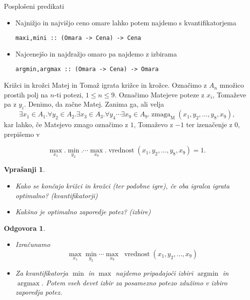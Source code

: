 \documentclass{beamer}
\newtheorem{vpr}{Vprašanji}
\newtheorem{odg}{Odgovora}
\def\obs{\exists}
\def\fora{\forall}
\newcommand{\argmin}{\operatorname{argmin}}
\newcommand{\argmax}{\operatorname{argmax}}
\begin{document}
\begin{frame}[fragile]{Posplošeni predikati}

\begin{itemize}
\item Najnižjo in najvišjo ceno omare lahko potem najdemo s kvantifikatorjema
\begin{lstlisting}
maxi,mini :: (Omara -> Cena) -> Cena
\end{lstlisting}
\item Najcenejšo in najdražjo omaro pa najdemo z izbirama
\begin{lstlisting}
argmin,argmax :: (Omara -> Cena) -> Omara
\end{lstlisting}
\end{itemize}
\end{frame}

\begin{frame}{Križci in krožci}
Matej in Tomaž igrata križce in krožce. Označimo z $A_n$ množico prostih polj na $n$-ti potezi, $1\leq n\leq 9$.
Označimo Matejeve poteze z $x_i$, Tomaževe pa z $y_i$. Denimo, da začne Matej.  Zanima ga, ali velja
$$\obs x_1\in A_1.\fora y_2 \in A_2. \obs x_3\in A_3.\fora y_4 \cdots \obs x_9 \in A_9. \operatorname{zmaga}_\text{M}(x_1,y_2,\dots, y_8,x_9) \text{,}$$
\pause
kar lahko, če Matejevo zmago označimo z $1$, Tomaževo z $-1$ ter izenačenje z $0$, prepišemo v

$$\max_{x_1}. \min_{y_2}. \cdots \max_{x_9}. \operatorname{vrednost}(x_1, y_2,\dots, y_8, x_9) = 1\text{.}$$


\end{frame}

\begin{frame}
\begin{vpr}
	\begin{itemize}
	\item Kako se končajo križci in krožci (ter podobne igre), če oba igralca igrata optimalno? (kvantifikatorji)
	\item Kakšno je optimalno zaporedje potez? (izbire)
	\end{itemize}
\end{vpr}
\pause
\begin{odg}
	\begin{itemize}
	\item Izračunamo $$\max_{x_1}\min_{y_2}\cdots \max_{x_9}\;\operatorname{vrednost}(x_1, y_2,\dots, x_9)$$
	\item Za kvantifikatorja $\min$ in $\max$ najdemo pripadajoči izbiri $\argmin$ in $\argmax$. Potem vseh devet izbir
	za posamezno potezo zdužimo v izbiro zaporedja potez.
	\end{itemize}
\end{odg}

\end{frame}
\end{document}
